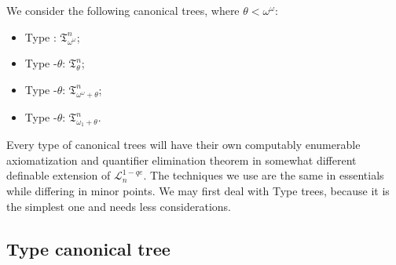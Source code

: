 \documentclass{amsart}
\theoremstyle{definition}
\begin{document}
We consider the following canonical trees, where $\theta<\omega^\omega$:
\begin{itemize}
    \item Type \MakeUppercase{}: $\mathfrak{T}_{\omega^\omega}^n$;
    \item Type \MakeUppercase{}-$\theta$: $\mathfrak{T}_{\theta}^n$;
    \item Type \MakeUppercase{}-$\theta$: $\mathfrak{T}_{\omega^\omega+\theta}^n$;
    \item Type \MakeUppercase{}-$\theta$: $\mathfrak{T}_{\omega_1+\theta}^n$.
\end{itemize}

Every type of canonical trees will have their own computably enumerable axiomatization and quantifier elimination theorem in somewhat different definable extension of $\mathcal{L}_n^{1-qe}$. The techniques we use are the same in essentials while differing in minor points. We may first deal with Type \MakeUppercase{} trees, because it is the simplest one and needs less considerations.

\subsection{Type \MakeUppercase{} canonical tree}\label{sec:type1syn}
\end{document}
